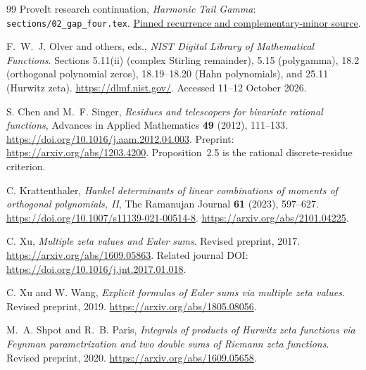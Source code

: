 \documentclass[11pt,a4paper]{article}
\theoremstyle{definition}
\theoremstyle{remark}
\numberwithin{equation}{section}
\begin{document}
\begin{thebibliography}{99}
ProveIt research continuation,
\emph{Harmonic Tail Gamma}:
\texttt{sections/02\_gap\_four.tex}.
\href{https://github.com/VladimirReshetnikov/ProveIt/blob/c4036d60715916ae72dd18983782fdb182840b86/Analysis/Polylogarithms/docs/reports/stieltjes-harmonic-resonance/continuations/harmonic-tail-gamma/sections/02_gap_four.tex}{Pinned recurrence and complementary-minor source}.

F.~W.~J. Olver and others, eds.,
\emph{NIST Digital Library of Mathematical Functions}.
Sections 5.11(ii) (complex Stirling remainder), 5.15 (polygamma),
18.2 (orthogonal polynomial zeros), 18.19--18.20 (Hahn
polynomials), and 25.11 (Hurwitz zeta).
\url{https://dlmf.nist.gov/}.
Accessed 11--12 October 2026.

S. Chen and M.~F. Singer,
\emph{Residues and telescopers for bivariate rational functions},
Advances in Applied Mathematics \textbf{49} (2012), 111--133.
\url{https://doi.org/10.1016/j.aam.2012.04.003}.
Preprint: \url{https://arxiv.org/abs/1203.4200}.
Proposition~2.5 is the rational discrete-residue criterion.

C. Krattenthaler,
\emph{Hankel determinants of linear combinations of moments of
orthogonal polynomials, II},
The Ramanujan Journal \textbf{61} (2023), 597--627.
\url{https://doi.org/10.1007/s11139-021-00514-8}.
\url{https://arxiv.org/abs/2101.04225}.

C. Xu, \emph{Multiple zeta values and Euler sums}.
Revised preprint, 2017.
\url{https://arxiv.org/abs/1609.05863}.
Related journal DOI: \url{https://doi.org/10.1016/j.jnt.2017.01.018}.

C. Xu and W. Wang,
\emph{Explicit formulas of Euler sums via multiple zeta values}.
Revised preprint, 2019.
\url{https://arxiv.org/abs/1805.08056}.

M.~A. Shpot and R.~B. Paris,
\emph{Integrals of products of Hurwitz zeta functions via Feynman
parametrization and two double sums of Riemann zeta functions}.
Revised preprint, 2020.
\url{https://arxiv.org/abs/1609.05658}.

\end{thebibliography}

\end{document}
